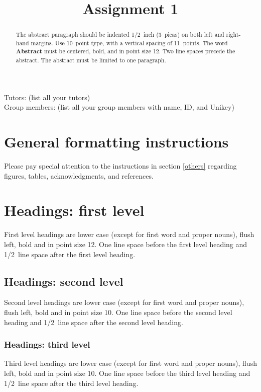\documentclass{article} %
\title{Assignment 1}
\begin{document}
\maketitle

Tutors: (list all your tutors)\\
Group members: (list all your group members with name, ID, and Unikey)\\

\begin{abstract}
The abstract paragraph should be indented 1/2~inch (3~picas) on both left and
right-hand margins. Use 10~point type, with a vertical spacing of 11~points.
The word \textbf{Abstract} must be centered, bold, and in point size 12. Two
line spaces precede the abstract. The abstract must be limited to one
paragraph.
\end{abstract}


\section{General formatting instructions}
\label{gen_inst}

Please pay special attention to the instructions in section \ref{others}
regarding figures, tables, acknowledgments, and references.

\section{Headings: first level}
\label{headings}

First level headings are lower case (except for first word and proper nouns),
flush left, bold and in point size 12. One line space before the first level
heading and 1/2~line space after the first level heading.

\subsection{Headings: second level}

Second level headings are lower case (except for first word and proper nouns),
flush left, bold and in point size 10. One line space before the second level
heading and 1/2~line space after the second level heading.

\subsubsection{Headings: third level}

Third level headings are lower case (except for first word and proper nouns),
flush left, bold and in point size 10. One line space before the third level
heading and 1/2~line space after the third level heading.
\end{document}
